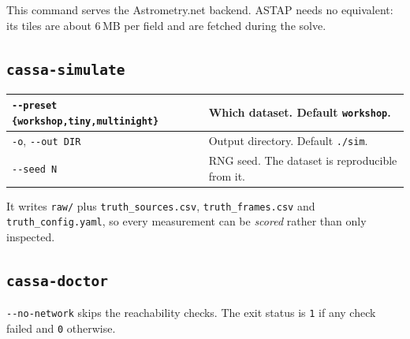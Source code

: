 \documentclass[11pt,a4paper]{article}
\begin{document}
This command serves the Astrometry.net backend. ASTAP needs no equivalent: its
tiles are about 6\,MB per field and are fetched during the solve.

\subsection{\texttt{cassa-simulate}}
\begin{center}
\begin{tabularx}{\textwidth}{|l|X|}
\hline
\texttt{-{}-preset \{workshop,tiny,multinight\}} & Which dataset. Default \texttt{workshop}. \\
\hline
\texttt{-o}, \texttt{-{}-out DIR} & Output directory. Default \texttt{./sim}. \\
\hline
\texttt{-{}-seed N} & RNG seed. The dataset is reproducible from it. \\
\hline
\end{tabularx}
\end{center}

It writes \texttt{raw/} plus \texttt{truth\_sources.csv},
\texttt{truth\_frames.csv} and \texttt{truth\_config.yaml}, so every measurement
can be \emph{scored} rather than only inspected.

\subsection{\texttt{cassa-doctor}}
\texttt{-{}-no-network} skips the reachability checks. The exit status is
\texttt{1} if any check failed and \texttt{0} otherwise.
\end{document}

